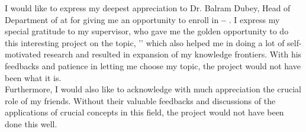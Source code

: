 \documentclass[11pt, a4paper, oneside]{Thesis} %
\begin{document}
\begin{acknowledgements}
I would like to express my deepest appreciation to Dr. Balram Dubey, Head of Department of \deptname{} at \univname{} for giving me an opportunity to enroll in \textbf{\doctype{} -- \ccode{}}. I express my special gratitude to my supervisor, \textbf{\supname{}} who gave me the golden opportunity to do this interesting project on the topic, '\ttitle{}' which also helped me in doing a lot of self-motivated research and resulted in expansion of my knowledge frontiers. With his feedbacks and patience in letting me choose my topic, the project would not have been what it is. \\
Furthermore, I would also like to acknowledge with much appreciation the crucial role of my friends. Without their valuable feedbacks and discussions of the applications of crucial concepts in this field, the project would not have been done this well.\\


\begin{flushright}
\authornames{}
  
\end{flushright}
\end{acknowledgements}


\pagestyle{fancy}

\tableofcontents %

\listoffigures %





\end{document}
